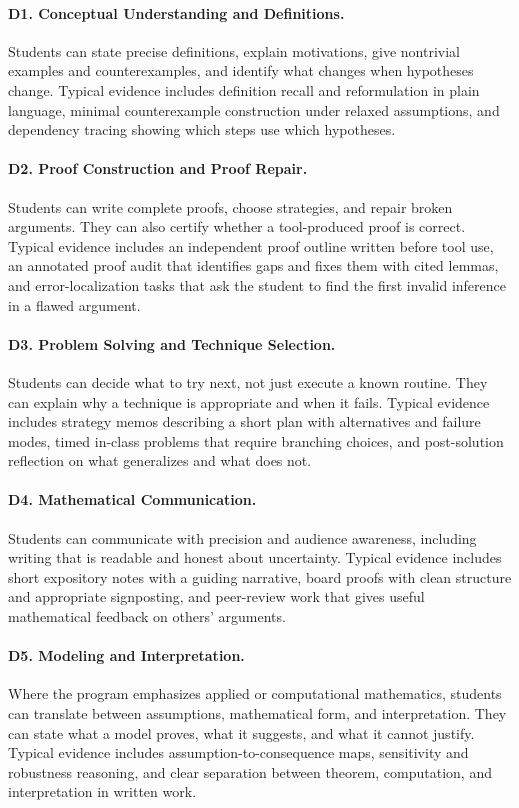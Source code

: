 \documentclass{SIAMbook2023}
\begin{document}
\paragraph{D1. Conceptual Understanding and Definitions.}
Students can state precise definitions, explain motivations, give nontrivial examples and counterexamples, and identify what changes when hypotheses change. Typical evidence includes definition recall and reformulation in plain language, minimal counterexample construction under relaxed assumptions, and dependency tracing showing which steps use which hypotheses.

\paragraph{D2. Proof Construction and Proof Repair.}
Students can write complete proofs, choose strategies, and repair broken arguments. They can also certify whether a tool-produced proof is correct. Typical evidence includes an independent proof outline written before tool use, an annotated proof audit that identifies gaps and fixes them with cited lemmas, and error-localization tasks that ask the student to find the first invalid inference in a flawed argument.

\paragraph{D3. Problem Solving and Technique Selection.}
Students can decide what to try next, not just execute a known routine. They can explain why a technique is appropriate and when it fails. Typical evidence includes strategy memos describing a short plan with alternatives and failure modes, timed in-class problems that require branching choices, and post-solution reflection on what generalizes and what does not.

\paragraph{D4. Mathematical Communication.}
Students can communicate with precision and audience awareness, including writing that is readable and honest about uncertainty. Typical evidence includes short expository notes with a guiding narrative, board proofs with clean structure and appropriate signposting, and peer-review work that gives useful mathematical feedback on others' arguments.

\paragraph{D5. Modeling and Interpretation.}
Where the program emphasizes applied or computational mathematics, students can translate between assumptions, mathematical form, and interpretation. They can state what a model proves, what it suggests, and what it cannot justify. Typical evidence includes assumption-to-consequence maps, sensitivity and robustness reasoning, and clear separation between theorem, computation, and interpretation in written work.
\end{document}
